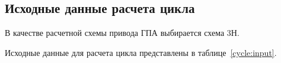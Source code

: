 \subsection{Исходные данные расчета цикла}
В качестве расчетной схемы привода ГПА выбирается схема 3Н.

Исходные данные для расчета цикла представлены в таблице~\ref{cycle:input}.